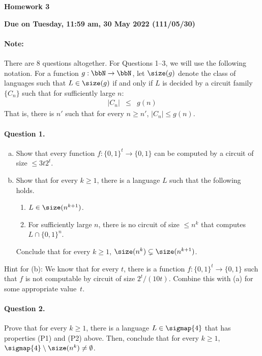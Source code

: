 \documentclass[11pt, a4paper]{article}
\renewcommand{\lessontitle}{Homework 3}
\renewcommand{\fulltitle}{\lessontitle}
\begin{document}
\date{}



\begin{center}
{\Large {\bf \fulltitle}}
\end{center}
\begin{center}
{\Large {\bf Due on Tuesday, 11:59 am, 30 May 2022 (111/05/30)}}
\end{center}


\paragraph*{Note:} There are 8 questions altogether.
For Questions 1--3, we will use the following notation.
For a function $g:\bbN\to\bbN$, let $\size(g)$ denote
the class of languages such that $L \in \size(g)$ if and only if 
$L$ is decided by a circuit family $\{C_n\}$ such that for sufficiently large $n$:
\begin{eqnarray*}
|C_n| & \leq & g(n)
\end{eqnarray*}
That is, there is $n'$ such that for every $n\geq n'$, $|C_n|\leq g(n)$.


\paragraph*{Question 1.}
\begin{enumerate}[(a)]
\item 
Show that every function $f:\{0,1\}^t\to\{0,1\}$
can be computed by a circuit of size $\leq 3t2^t$.
\item
Show that for every $k\geq 1$, there is a language $L$ such that the following holds.
\begin{enumerate}[(P1)]
\item 
$L \in \size(n^{k+1})$.
\item
For sufficiently large $n$, there is no circuit of size $\leq n^k$ that computes $L\cap\{0,1\}^n$.
\end{enumerate}
Conclude that for every $k\geq 1$, $\size(n^k)\subsetneq \size(n^{k+1})$.
\end{enumerate}
Hint for (b): We know that for every $t$, there is a function $f:\{0,1\}^t\to\{0,1\}$
such that $f$ is not computable by circuit of size $2^t/(10t)$.
Combine this with (a) for some appropriate value~$t$.

\paragraph*{Question 2.}
Prove that for every $k\geq 1$,
there is a language $L \in \sigmap {4}$ that has properties (P1) and (P2) above.
Then, conclude that for every $k\geq 1$, $\sigmap {4}\setminus \size(n^k) \neq \emptyset$.
\end{document}
